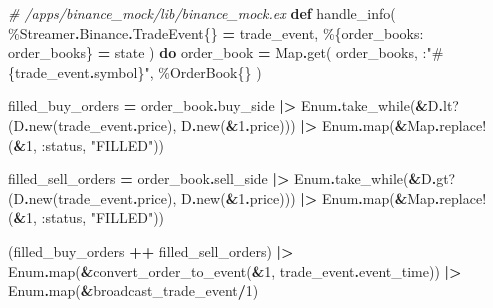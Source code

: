 \documentclass[
]{book}
\newenvironment{Shaded}{\begin{snugshade}}{\end{snugshade}}
\newcommand{\CommentTok}[1]{\textcolor[rgb]{0.56,0.35,0.01}{\textit{#1}}}
\newcommand{\ConstantTok}[1]{\textcolor[rgb]{0.00,0.00,0.00}{#1}}
\newcommand{\DecValTok}[1]{\textcolor[rgb]{0.00,0.00,0.81}{#1}}
\newcommand{\KeywordTok}[1]{\textcolor[rgb]{0.13,0.29,0.53}{\textbf{#1}}}
\newcommand{\NormalTok}[1]{#1}
\newcommand{\OperatorTok}[1]{\textcolor[rgb]{0.81,0.36,0.00}{\textbf{#1}}}
\newcommand{\OtherTok}[1]{\textcolor[rgb]{0.56,0.35,0.01}{#1}}
\newcommand{\StringTok}[1]{\textcolor[rgb]{0.31,0.60,0.02}{#1}}
\newcommand{\VariableTok}[1]{\textcolor[rgb]{0.00,0.00,0.00}{#1}}
\begin{document}
\begin{Shaded}
\begin{Highlighting}[]
\CommentTok{\# /apps/binance\_mock/lib/binance\_mock.ex}
  \KeywordTok{def}\NormalTok{ handle\_info(}
\NormalTok{        \%}\ConstantTok{Streamer}\OperatorTok{.}\ConstantTok{Binance}\OperatorTok{.}\ConstantTok{TradeEvent}\NormalTok{\{\} }\OperatorTok{=}\NormalTok{ trade\_event,}
\NormalTok{        \%\{}\VariableTok{order\_books:}\NormalTok{ order\_books\} }\OperatorTok{=}\NormalTok{ state}
\NormalTok{      ) }\KeywordTok{do}
\NormalTok{    order\_book }\OperatorTok{=}
      \ConstantTok{Map}\OperatorTok{.}\NormalTok{get(}
\NormalTok{        order\_books,}
\NormalTok{        :}\StringTok{"}\OtherTok{\#\{}\NormalTok{trade\_event}\OperatorTok{.}\NormalTok{symbol}\OtherTok{\}}\StringTok{"}\NormalTok{,}
\NormalTok{        \%}\ConstantTok{OrderBook}\NormalTok{\{\}}
\NormalTok{      )}

\NormalTok{    filled\_buy\_orders }\OperatorTok{=}
\NormalTok{      order\_book}\OperatorTok{.}\NormalTok{buy\_side}
      \OperatorTok{|\textgreater{}} \ConstantTok{Enum}\OperatorTok{.}\NormalTok{take\_while(}\OperatorTok{\&}\NormalTok{D}\OperatorTok{.}\NormalTok{lt?(D}\OperatorTok{.}\NormalTok{new(trade\_event}\OperatorTok{.}\NormalTok{price), D}\OperatorTok{.}\NormalTok{new(}\OperatorTok{\&}\DecValTok{1}\OperatorTok{.}\NormalTok{price)))}
      \OperatorTok{|\textgreater{}} \ConstantTok{Enum}\OperatorTok{.}\NormalTok{map(}\OperatorTok{\&}\ConstantTok{Map}\OperatorTok{.}\NormalTok{replace!(}\OperatorTok{\&}\DecValTok{1}\NormalTok{, }\VariableTok{:status}\NormalTok{, }\StringTok{"FILLED"}\NormalTok{))}

\NormalTok{    filled\_sell\_orders }\OperatorTok{=}
\NormalTok{      order\_book}\OperatorTok{.}\NormalTok{sell\_side}
      \OperatorTok{|\textgreater{}} \ConstantTok{Enum}\OperatorTok{.}\NormalTok{take\_while(}\OperatorTok{\&}\NormalTok{D}\OperatorTok{.}\NormalTok{gt?(D}\OperatorTok{.}\NormalTok{new(trade\_event}\OperatorTok{.}\NormalTok{price), D}\OperatorTok{.}\NormalTok{new(}\OperatorTok{\&}\DecValTok{1}\OperatorTok{.}\NormalTok{price)))}
      \OperatorTok{|\textgreater{}} \ConstantTok{Enum}\OperatorTok{.}\NormalTok{map(}\OperatorTok{\&}\ConstantTok{Map}\OperatorTok{.}\NormalTok{replace!(}\OperatorTok{\&}\DecValTok{1}\NormalTok{, }\VariableTok{:status}\NormalTok{, }\StringTok{"FILLED"}\NormalTok{))}

\NormalTok{    (filled\_buy\_orders }\OperatorTok{++}\NormalTok{ filled\_sell\_orders)}
    \OperatorTok{|\textgreater{}} \ConstantTok{Enum}\OperatorTok{.}\NormalTok{map(}\OperatorTok{\&}\NormalTok{convert\_order\_to\_event(}\OperatorTok{\&}\DecValTok{1}\NormalTok{, trade\_event}\OperatorTok{.}\NormalTok{event\_time))}
    \OperatorTok{|\textgreater{}} \ConstantTok{Enum}\OperatorTok{.}\NormalTok{map(}\OperatorTok{\&}\NormalTok{broadcast\_trade\_event}\OperatorTok{/}\DecValTok{1}\NormalTok{)}


\end{Highlighting}
\end{Shaded}
\end{document}

